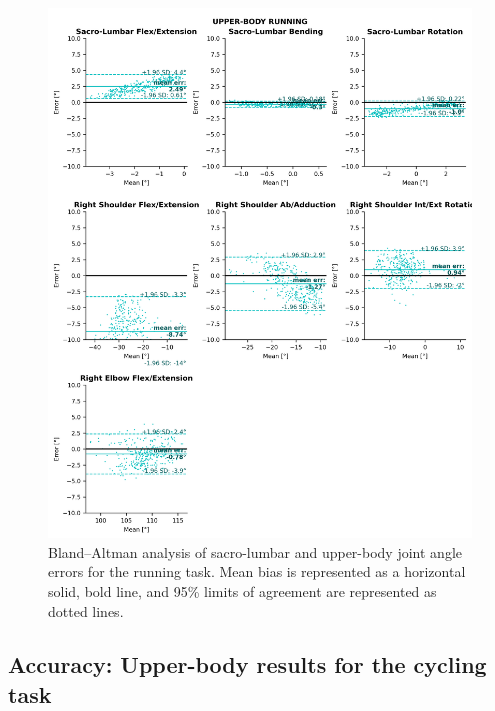 \begin{figure}[!ht]
	\centering
	\def\svgwidth{1\columnwidth}
	\fontsize{10pt}{10pt}\selectfont
	\includegraphics[height=\dimexpr\textheight-119pt]{"../Annexes/Figures/Fig_BlandRunUp.png"}
	\caption{Bland–Altman analysis of sacro-lumbar and upper-body joint angle errors for the running task. Mean bias is represented as a horizontal solid, bold line, and 95\% limits of agreement are represented as dotted lines.}
	\label{fig_blandrunup}
\end{figure}


\clearpage
\subsection{Accuracy: Upper-body results for the cycling task}

